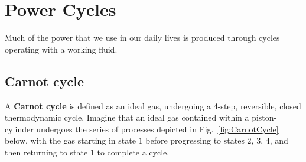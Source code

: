 \section{Power Cycles}
Much of the power that we use in our daily lives is produced through cycles operating with a working fluid.

\subsection{Carnot cycle}
A \textbf{Carnot cycle} is defined as an ideal gas, undergoing a 4-step, reversible, closed thermodynamic cycle. Imagine that an ideal gas contained within a piston-cylinder undergoes the series of processes depicted in Fig.~\ref{fig:CarnotCycle} below, with the gas starting in state $1$ before progressing to states $2$, $3$, $4$, and then returning to state $1$ to complete a cycle. 
